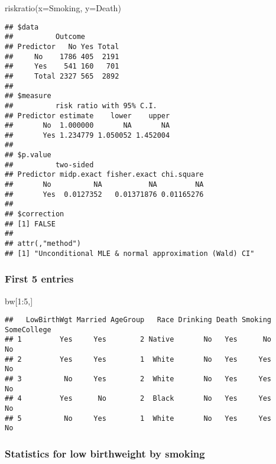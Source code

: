 \documentclass[
]{article}
\newenvironment{Shaded}{\begin{snugshade}}{\end{snugshade}}
\newcommand{\AttributeTok}[1]{\textcolor[rgb]{0.77,0.63,0.00}{#1}}
\newcommand{\DecValTok}[1]{\textcolor[rgb]{0.00,0.00,0.81}{#1}}
\newcommand{\FunctionTok}[1]{\textcolor[rgb]{0.00,0.00,0.00}{#1}}
\newcommand{\NormalTok}[1]{#1}
\newcommand{\SpecialCharTok}[1]{\textcolor[rgb]{0.00,0.00,0.00}{#1}}
\begin{document}
\begin{Shaded}
\begin{Highlighting}[]
\FunctionTok{riskratio}\NormalTok{(}\AttributeTok{x=}\NormalTok{Smoking, }\AttributeTok{y=}\NormalTok{Death)}
\end{Highlighting}
\end{Shaded}

\begin{verbatim}
## $data
##          Outcome
## Predictor   No Yes Total
##     No    1786 405  2191
##     Yes    541 160   701
##     Total 2327 565  2892
## 
## $measure
##          risk ratio with 95% C.I.
## Predictor estimate    lower    upper
##       No  1.000000       NA       NA
##       Yes 1.234779 1.050052 1.452004
## 
## $p.value
##          two-sided
## Predictor midp.exact fisher.exact chi.square
##       No          NA           NA         NA
##       Yes  0.0127352   0.01371876 0.01165276
## 
## $correction
## [1] FALSE
## 
## attr(,"method")
## [1] "Unconditional MLE & normal approximation (Wald) CI"
\end{verbatim}

\hypertarget{first-5-entries}{%
\subsubsection{First 5 entries}\label{first-5-entries}}

\begin{Shaded}
\begin{Highlighting}[]
\NormalTok{bw[}\DecValTok{1}\SpecialCharTok{:}\DecValTok{5}\NormalTok{,]}
\end{Highlighting}
\end{Shaded}

\begin{verbatim}
##   LowBirthWgt Married AgeGroup   Race Drinking Death Smoking SomeCollege
## 1         Yes     Yes        2 Native       No   Yes      No          No
## 2         Yes     Yes        1  White       No   Yes     Yes          No
## 3          No     Yes        2  White       No   Yes     Yes          No
## 4         Yes      No        2  Black       No   Yes     Yes          No
## 5          No     Yes        1  White       No   Yes     Yes          No
\end{verbatim}

\hypertarget{statistics-for-low-birthweight-by-smoking}{%
\subsubsection{Statistics for low birthweight by
smoking}\label{statistics-for-low-birthweight-by-smoking}}
\end{document}
